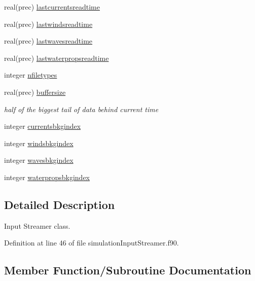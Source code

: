 \begin{DoxyCompactItemize}
real(prec) \mbox{\hyperlink{structsimulationinputstreamer__mod_1_1input__streamer__class_a375225e0aa1ed0f08363da1bafc139e3}{lastcurrentsreadtime}}
\item 
real(prec) \mbox{\hyperlink{structsimulationinputstreamer__mod_1_1input__streamer__class_aac395ab94f76af36fa3e039f32b38416}{lastwindsreadtime}}
\item 
real(prec) \mbox{\hyperlink{structsimulationinputstreamer__mod_1_1input__streamer__class_a6319b7afca64a7e4a0c20616ff6cbb80}{lastwavesreadtime}}
\item 
real(prec) \mbox{\hyperlink{structsimulationinputstreamer__mod_1_1input__streamer__class_a281ca1f48f66bc5ce10ea815bc38dcf0}{lastwaterpropsreadtime}}
\item 
integer \mbox{\hyperlink{structsimulationinputstreamer__mod_1_1input__streamer__class_a520a1494948348d832566cee439c2638}{nfiletypes}}
\item 
real(prec) \mbox{\hyperlink{structsimulationinputstreamer__mod_1_1input__streamer__class_a840b26872bc3a8ddb8bab387590860d6}{buffersize}}
\begin{DoxyCompactList}\small\item\em half of the biggest tail of data behind current time \end{DoxyCompactList}\item 
integer \mbox{\hyperlink{structsimulationinputstreamer__mod_1_1input__streamer__class_a6f87d37ed71015e51cf39eb3c33d86f8}{currentsbkgindex}}
\item 
integer \mbox{\hyperlink{structsimulationinputstreamer__mod_1_1input__streamer__class_acb8972bcc887d3a6d0ffabfffb08a616}{windsbkgindex}}
\item 
integer \mbox{\hyperlink{structsimulationinputstreamer__mod_1_1input__streamer__class_a0eeac60df733bf08af360334b8143536}{wavesbkgindex}}
\item 
integer \mbox{\hyperlink{structsimulationinputstreamer__mod_1_1input__streamer__class_a4737044af6c5f1cc1206282be4b920d0}{waterpropsbkgindex}}
\end{DoxyCompactItemize}


\subsection{Detailed Description}
Input Streamer class. 

Definition at line 46 of file simulation\+Input\+Streamer.\+f90.



\subsection{Member Function/\+Subroutine Documentation}
\mbox{\label{structsimulationinputstreamer__mod_1_1input__streamer__class_a94846e4dd810043b8a37ad3c3956cc90}} 
